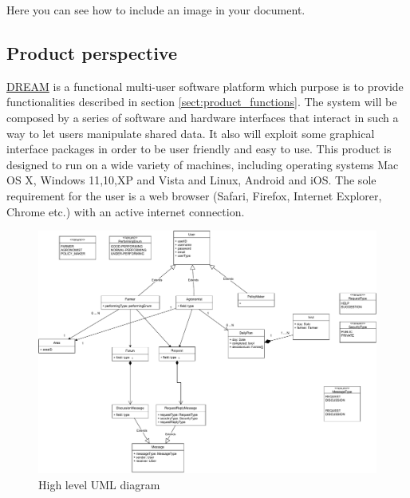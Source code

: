 Here you can see how to include an image in your document.


\subsection{Product perspective}
\hyperref[tab:acronymsTable]{DREAM} is a functional multi-user software platform which purpose is to provide functionalities described in section \ref{sect:product_functions}. The system will be composed by a series of software and hardware interfaces that interact in such a way to let users manipulate shared data. It also will exploit some graphical interface packages in order to be user friendly and easy to use.
This product is designed to run on a wide variety of machines, including operating systems Mac OS X, Windows 11,10,XP and Vista and Linux, Android and iOS. The sole requirement for the user is a web browser (Safari, Firefox, Internet Explorer, Chrome etc.) with an active internet connection.

\begin{figure}[H]
	\centering
    \includegraphics[page=1, width=\textwidth]{Images/SE2 - class diagram.pdf}
	\caption{\label{fig:uml_class_diagram}High level UML diagram}
\end{figure}

